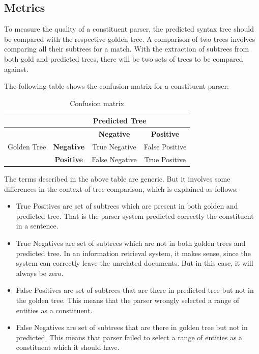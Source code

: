 \documentclass[a4paper, 11pt]{article}
\begin{document}
\subsection{Metrics}

To measure the quality of a constituent parser, the predicted syntax tree should be compared with the respective golden tree. A comparison of two trees involves comparing all their subtrees for a match. With the extraction of subtrees from both gold and predicted trees, there will be two sets of trees to be compared against.

The following table shows the confusion matrix for a constituent parser:

\begin{table}[h!]
  \begin{center}
    \label{tab:table1}
    \begin{tabular}{c|c|c|c}
      &  \multicolumn{3}{c}{Predicted Tree}\\
	  \hline
      \multirow{3}{*}{Golden Tree} & & \textbf{Negative} & \textbf{Positive} \\
      & \textbf{Negative} & True Negative & False Positive \\
      & \textbf{Positive} & False Negative & True Positive\\
    \end{tabular}
    \caption{Confusion matrix}
  \end{center}
\end{table}

The terms described in the above table are generic. But it involves some differences in the context of tree comparison, which is explained as follows:
\begin{itemize}
\item True Positives are set of subtrees which are present in both golden and predicted tree. That is the parser system predicted correctly the constituent in a sentence.
\item True Negatives are set of subtrees which are not in both golden trees and predicted tree. In an information retrieval system, it makes sense, since the system can correctly leave the unrelated documents. But in this case, it will always be zero.
\item False Positives are set of subtrees that are there in predicted tree but not in the golden tree. This means that the parser wrongly selected a range of entities as a constituent. 
\item False Negatives are set of subtrees that are there in golden tree but not in predicted. This means that parser failed to select a range of entities as a constituent which it should have. 
\end{itemize}
\end{document}
